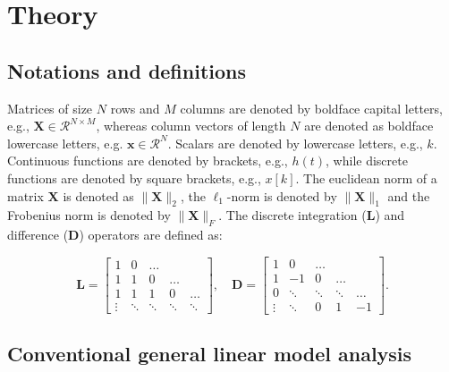 
\section{Theory}

\subsection{Notations and definitions}

Matrices of size $N$ rows and $M$ columns are denoted by boldface capital letters, e.g., $\mathbf{X} \in \mathcal{R}^{N\times M}$, whereas column vectors of length $N$ are denoted as boldface lowercase letters, e.g. $\mathbf{x} \in \mathcal{R}^{N}$. Scalars are denoted by lowercase letters, e.g., $k$. Continuous functions are denoted by brackets, e.g., $h(t)$, while discrete functions are denoted by square brackets, e.g., $x[k]$. The euclidean norm of a matrix $\mathbf{X}$ is denoted as $\|\mathbf{X}\|_2$, the $\ell_1$-norm is denoted by $\| \mathbf{X} \|_1$ and the Frobenius norm is denoted by $\| \mathbf{X} \|_F$. The discrete integration ($\mathbf{L}$) and difference ($\mathbf{D}$) operators are defined as:

$$
\mathbf{L} = \left[\begin{array}{ccccc}
1 & 0 & \ldots & & \\
1 & 1 & 0 & \ldots & \\
1 & 1 & 1 & 0 & \ldots \\
\vdots & \ddots & \ddots & \ddots & \ddots
\end{array}\right], \quad \mathbf{D} = \left[\begin{array}{ccccc}
1 & 0 & \ldots & & \\
1 & -1 & 0 & \ldots & \\
0 & \ddots & \ddots & \ddots & \ldots \\
\vdots & \ddots & 0 & 1 & -1
\end{array}\right].
$$

\subsection{Conventional general linear model analysis}

